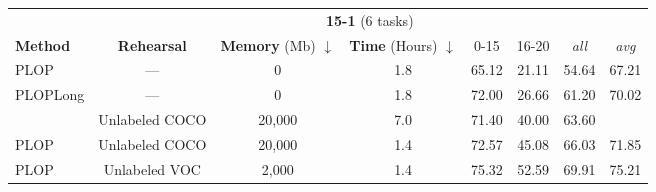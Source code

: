 \begin{table*}[t]
    \centering
    \begin{adjustbox}{max width=\textwidth}
        \begin{tabular}{@{}l|ccc|cccc@{}}
            \toprule
                                                           & \multicolumn{7}{c}{\textbf{15-1} (6 tasks)}                                                                                                                                              \\
            \textbf{Method}                                & \textbf{Rehearsal}                          & \textbf{Memory} (Mb) $\downarrow$ & \textbf{Time} (Hours) $\downarrow$ & 0-15           & 16-20          & \textit{all}   & \textit{avg}   \\
            \midrule
            PLOP                                           & ---                                         & 0                                 & 1.8                                & 65.12          & 21.11          & 54.64          & 67.21          \\
            PLOPLong                                       & ---                                         & 0                                 & 1.8                                & 72.00          & 26.66          & 61.20          & 70.02          \\
            \hdashline
            \cite{yu2020continualsegmentationselftraining} & Unlabeled COCO                              & 20,000                            & 7.0                                & 71.40          & 40.00          & 63.60          &                \\
            PLOP                                           & Unlabeled COCO                              & 20,000                            & 1.4                                & 72.57          & 45.08          & 66.03          & 71.85          \\
            PLOP                                           & Unlabeled VOC                               & 2,000                             & 1.4                                & 75.32          & 52.59          & 69.91          & 75.21          \\

\end{tabular}
\end{adjustbox}
\end{table*}

